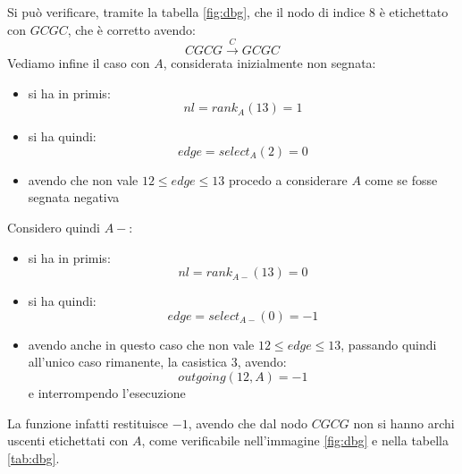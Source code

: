 \documentclass[a4paper,12pt, oneside]{book}
\begin{document}
\begin{esempio}
  Si può verificare, tramite la tabella \ref{fig:dbg}, che il nodo di indice $8$
  è etichettato con $GCGC$, che è corretto avendo:
  \[CGCG\stackrel{C}{\to}GCGC\]
  Vediamo infine il caso con $A$, considerata inizialmente non segnata:
  \begin{itemize}
    \item si ha in primis:
    \[nl=rank_A(13)=1\]
    \item si ha quindi:
    \[edge = select_A(2)=0\]
    \item avendo che non vale $12\leq edge \leq 13$ procedo a considerare
    $A$ come se fosse segnata negativa
  \end{itemize}
  Considero quindi $A-$:
  \begin{itemize}
    \item si ha in primis:
    \[nl=rank_{A-}(13)=0\]
    \item si ha quindi:
    \[edge = select_{A-}(0)=-1\]
    \item avendo anche in questo caso che non vale $12\leq edge \leq 13$,
    passando quindi all'unico caso rimanente, la casistica 3, avendo:
    \[outgoing(12,A)=-1\]
    e interrompendo l'esecuzione
  \end{itemize}
  La funzione infatti restituisce $-1$, avendo che dal nodo $CGCG$ non si hanno
  archi uscenti etichettati con $A$, come verificabile nell'immagine
  \ref{fig:dbg} e nella tabella \ref{tab:dbg}.
\end{esempio}
\end{document}
